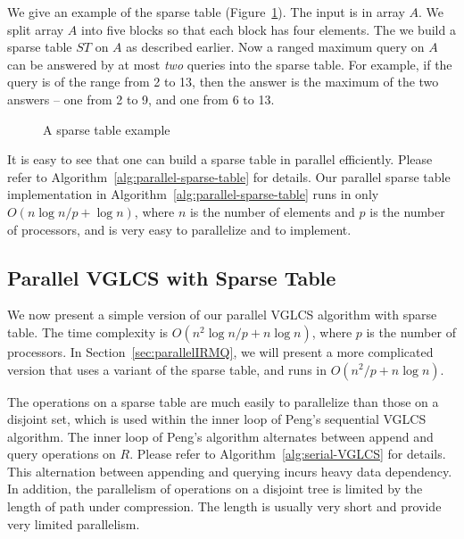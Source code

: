 We give an example of the sparse table
(Figure~\ref{fig:interval-decomposition}).  The input is in array
$A$. We split array $A$ into five blocks so that each block has four
elements.  The we build a sparse table $ST$ on $A$ as described
earlier.  Now a ranged maximum query on $A$ can be answered by at most
{\em two} queries into the sparse table.  For example, if the query is
of the range from 2 to 13, then the answer is the maximum of the two
answers -- one from 2 to 9, and one from 6 to 13.

\begin{figure}[!thb]
  \centering {} 
  \caption{A sparse table example}
  \label{fig:interval-decomposition}
\end{figure}

It is easy to see that one can build a sparse table in parallel
efficiently.  Please refer to
Algorithm~\ref{alg:parallel-sparse-table} for details.  Our parallel
sparse table implementation in
Algorithm~\ref{alg:parallel-sparse-table} runs in only $O(n \log n / p
+ \log n)$, where $n$ is the number of elements and $p$ is the number
of processors, and is very easy to parallelize and to implement.



\subsection{Parallel VGLCS with Sparse Table}

We now present a simple version of our parallel VGLCS algorithm with
sparse table.  The time complexity is $O(n^2 \log n / p + n \log n)$,
where $p$ is the number of processors.  In
Section~\ref{sec:parallelIRMQ}, we will present a more complicated
version that uses a variant of the sparse table, and runs in $O(n^2 /
p + n \log n)$.

The operations on a sparse table are much easily to parallelize than
those on a disjoint set, which is used within the inner loop of Peng's
sequential VGLCS algorithm.  The inner loop of Peng's algorithm
alternates between append and query operations on $R$.  Please refer
to Algorithm~\ref{alg:serial-VGLCS} for details.  This alternation
between appending and querying incurs heavy data dependency.  In
addition, the parallelism of operations on a disjoint tree is limited
by the length of path under compression.  The length is usually very
short and provide very limited parallelism.


